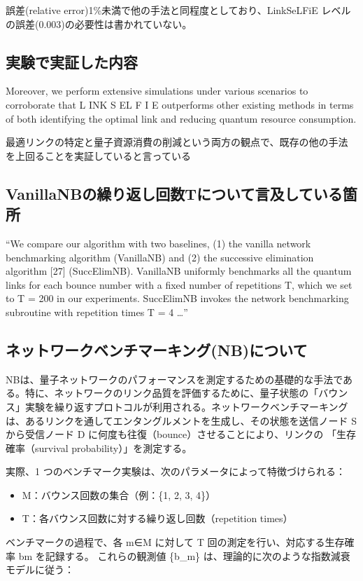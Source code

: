 \documentclass[technicalreport,dvipdfmx]{ieicej}
\begin{document}
誤差(relative error)1\%未満で他の手法と同程度としており、LinkSeLFiE
レベルの誤差(0.003)の必要性は書かれていない。


\subsection{実験で実証した内容}
\label{sec:orgd76da5c}
Moreover, we perform extensive simulations under
various scenarios to corroborate that L INK S EL F I E outperforms
other existing methods in terms of both identifying the optimal
link and reducing quantum resource consumption.

最適リンクの特定と量子資源消費の削減という両方の観点で、既存の他の手法
を上回ることを実証していると言っている

\subsection{VanillaNBの繰り返し回数Tについて言及している箇所}
\label{sec:org217721a}
“We compare our algorithm with two baselines, (1) the vanilla network
benchmarking algorithm (VanillaNB) and (2) the successive elimination
algorithm [27] (SuccElimNB).  VanillaNB uniformly benchmarks all the
quantum links for each bounce number with a fixed number of
repetitions T, which we set to T = 200 in our experiments.  SuccElimNB
invokes the network benchmarking subroutine with repetition times T =
4 …”




\subsection{ネットワークベンチマーキング(NB)について}
\label{sec:org00aadca}
NBは、量子ネットワークのパフォーマンスを測定するための基礎的な手法であ
る。特に、ネットワークのリンク品質を評価するために、量子状態の「バウン
ス」実験を繰り返すプロトコルが利用される。ネットワークベンチマーキング
は、あるリンクを通してエンタングルメントを生成し、その状態を送信ノード
S から受信ノード D に何度も往復（bounce）させることにより、リンクの
「生存確率（survival probability）」を測定する。

実際、1 つのベンチマーク実験は、次のパラメータによって特徴づけられる：
\begin{itemize}
\item M：バウンス回数の集合（例：\{1, 2, 3, 4\}）
\item T：各バウンス回数に対する繰り返し回数（repetition times）
\end{itemize}
ベンチマークの過程で、各 m∈M に対して T 回の測定を行い、対応する生存確
率 bm を記録する。
これらの観測値 \{b\_m\} は、理論的に次のような指数減衰モデルに従う：
\end{document}

